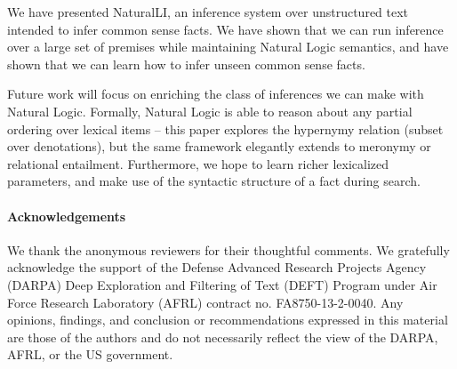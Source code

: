 We have presented NaturalLI, an inference system over
  unstructured text intended to infer common sense facts.
We have shown that we can run inference over a large set of premises
  while maintaining Natural Logic semantics, and have shown that
  we can learn how to infer unseen common sense facts.

Future work will focus on enriching the class of inferences we can
  make with Natural Logic.
Formally, Natural Logic is able to reason about any partial ordering
  over lexical items -- this paper explores the hypernymy relation
  (subset over denotations), but the same framework elegantly extends
  to meronymy or relational entailment.
Furthermore, we hope to learn richer lexicalized parameters,
  and make use of the syntactic structure of a fact during search.

\vspace{2ex}
{\footnotesize
\paragraph{\footnotesize Acknowledgements}
We thank the anonymous reviewers for their thoughtful comments.
We gratefully acknowledge the support of the Defense
Advanced Research Projects Agency (DARPA) Deep Exploration and Filtering
of Text (DEFT) Program under Air Force Research Laboratory (AFRL)
contract no. FA8750-13-2-0040. Any opinions, findings, and conclusion or
recommendations expressed in this material are those of the authors and
do not necessarily reflect the view of the DARPA, AFRL, or the US
government.

}
